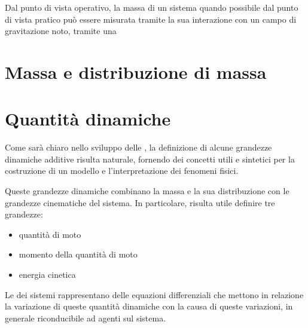 \documentclass[letterpaper,10pt,italian]{jupyterBook}
\begin{document}
\sphinxAtStartPar
Dal punto di vista operativo, la massa di un sistema \sphinxhyphen{} quando possibile dal punto di vista pratico \sphinxhyphen{} può essere misurata tramite la sua interazione con un campo di gravitazione noto, tramite una 


\section{Massa e distribuzione di massa}
\label{\detokenize{ch/mechanics/inertia:massa-e-distribuzione-di-massa}}\label{\detokenize{ch/mechanics/inertia:physics-hs-mechanics-inertia-mass-density}}

\section{Quantità dinamiche}
\label{\detokenize{ch/mechanics/inertia:quantita-dinamiche}}\label{\detokenize{ch/mechanics/inertia:physics-hs-mechanics-inertia-dynamical-quantities}}
\sphinxAtStartPar
Come sarà chiaro nello sviluppo delle {\hyperref[\detokenize{ch/mechanics/dynamics-notes:physics-hs-mechanics-dynamics-eom-points}]{}}, la definizione di alcune grandezze dinamiche additive risulta naturale, fornendo dei concetti utili e sintetici per la costruzione di un modello e l’interpretazione dei fenomeni fisici.

\sphinxAtStartPar
Queste grandezze dinamiche combinano la massa e la sua distribuzione con le grandezze cinematiche del sistema. In particolare, risulta utile definire tre grandezze:
\begin{itemize}
\item {} 
\sphinxAtStartPar
quantità di moto

\item {} 
\sphinxAtStartPar
momento della quantità di moto

\item {} 
\sphinxAtStartPar
energia cinetica

\end{itemize}

\sphinxAtStartPar
Le {\hyperref[\detokenize{ch/mechanics/dynamics-eom:physics-hs-mechanics-dynamics-eom}]{}} dei sistemi rappresentano delle equazioni differenziali che mettono in relazione la variazione di queste quantità dinamiche con la causa di queste variazioni, in generale riconducibile ad {\hyperref[\detokenize{ch/mechanics/actions:physics-hs-mechanics-actions}]{}} agenti sul sistema.
\end{document}
